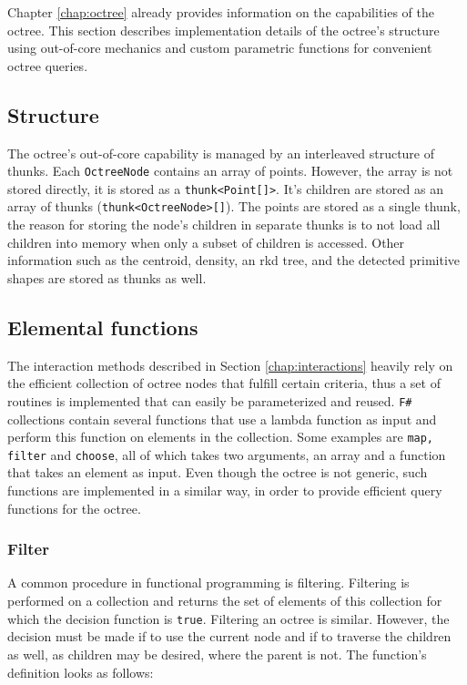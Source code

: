 Chapter \ref{chap:octree} already provides information on the capabilities of the octree. This section describes implementation details of the octree's structure using out-of-core mechanics and custom parametric functions for convenient octree queries. 


\subsection{Structure}

The octree's out-of-core capability is managed by an interleaved structure of thunks. Each \verb|OctreeNode| contains an array of points. However, the array is not stored directly, it is stored as a \verb|thunk<Point[]>|. It's children are stored as an array of thunks (\verb|thunk<OctreeNode>[]|). The points are stored as a single thunk, the reason for storing the node's children in separate thunks is to not load all children into memory when only a subset of children is accessed. Other information such as the centroid, density, an rkd tree, and the detected primitive shapes are stored as thunks as well. 


\subsection{Elemental functions}

The interaction methods described in Section \ref{chap:interactions} heavily rely on the efficient collection of octree nodes that fulfill certain criteria, thus a set of routines is implemented that can easily be parameterized and reused. \verb|F#| collections contain several functions that use a lambda function as input and perform this function on elements in the collection. Some examples are \verb|map, filter| and \verb|choose|, all of which takes two arguments, an array and a function that takes an element as input. Even though the octree is not generic, such functions are implemented in a similar way, in order to provide efficient query functions for the octree. 


\subsubsection{Filter}

A common procedure in functional programming is filtering. Filtering is performed on a collection and returns the set of elements of this collection for which the decision function is \verb|true|. Filtering an octree is similar. However, the decision must be made if to use the current node and if to traverse the children as well, as children may be desired, where the parent is not. 
The function's definition looks as follows: 

